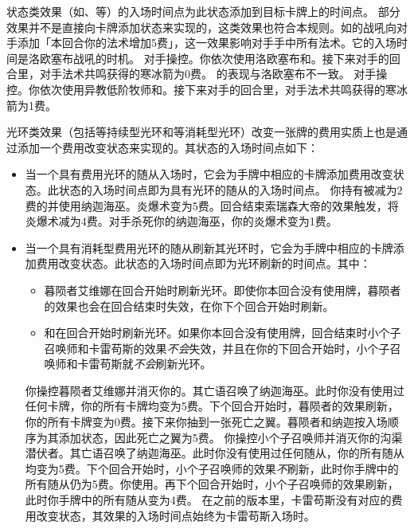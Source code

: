 状态类效果（如、等）的入场时间点为此状态添加到目标卡牌上的时间点。
\notice 部分效果并不是直接向卡牌添加状态来实现的，这类效果也符合本规则。如的战吼向对手添加「本回合你的法术增加5费」，这一效果影响对手手中所有法术。它的入场时间是洛欧塞布战吼的时机。
\example 对手操控。你依次使用洛欧塞布和。接下来对手的回合里，对手法术共鸣获得的寒冰箭为0费。
\exception {}的表现与洛欧塞布不一致。
\example 对手操控。你依次使用异教低阶牧师和。接下来对手的回合里，对手法术共鸣获得的寒冰箭为1费。

光环类效果（包括等持续型光环和等消耗型光环）改变一张牌的费用实质上也是通过添加一个费用改变状态来实现的。其状态的入场时间点如下：
\begin{itemize}
    \item 当一个具有费用光环的随从入场时，它会为手牌中相应的卡牌添加费用改变状态。此状态的入场时间点即为具有光环的随从的入场时间点。
        \example 你持有被减为2费的并使用纳迦海巫。炎爆术变为5费。回合结束索瑞森大帝的效果触发，将炎爆术减为4费。对手杀死你的纳迦海巫，你的炎爆术变为1费。
    \item 当一个具有消耗型费用光环的随从刷新其光环时，它会为手牌中相应的卡牌添加费用改变状态。此状态的入场时间点即为光环刷新的时间点。其中：
    \begin{itemize}
        \item 暮陨者艾维娜在回合开始时刷新光环。即使你本回合没有使用牌，暮陨者的效果也会在回合结束时失效，在你下个回合开始时刷新。
        \item {}和在回合开始时刷新光环。如果你本回合没有使用牌，回合结束时小个子召唤师和卡雷苟斯的效果\emph{不会}失效，并且在你的下回合开始时，小个子召唤师和卡雷苟斯就\emph{不会}刷新光环。
    \end{itemize}
        \example 你操控暮陨者艾维娜并消灭你的。其亡语召唤了纳迦海巫。此时你没有使用过任何卡牌，你的所有卡牌均变为5费。下个回合开始时，暮陨者的效果刷新，你的所有卡牌变为0费。接下来你抽到一张死亡之翼。暮陨者和纳迦按入场顺序为其添加状态，因此死亡之翼为5费。
        \example 你操控小个子召唤师并消灭你的沟渠潜伏者。其亡语召唤了纳迦海巫。此时你没有使用过任何随从，你的所有随从均变为5费。下个回合开始时，小个子召唤师的效果\emph{不}刷新，此时你手牌中的所有随从仍为5费。你使用。再下个回合开始时，小个子召唤师的效果刷新，此时你手牌中的所有随从变为4费。
        \notice {}在之前的版本里，卡雷苟斯没有对应的费用改变状态，其效果的入场时间点始终为卡雷苟斯入场时。


\end{itemize}
